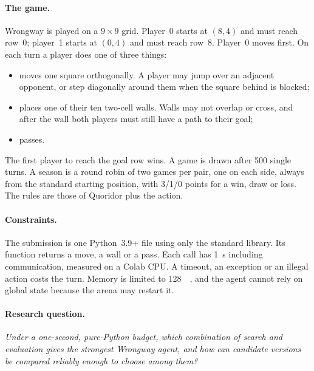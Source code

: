\paragraph{The game.}
Wrongway is played on a $9\times9$ grid. Player~0 starts at $(8,4)$ and must reach row~0;
player~1 starts at $(0,4)$ and must reach row~8. Player~0 moves first.
On each turn a player does one of three things:
\begin{itemize}
  \item moves one square orthogonally. A player may jump over an adjacent opponent, or step
        diagonally around them when the square behind is blocked;
  \item places one of their ten two-cell walls. Walls may not overlap or cross, and after the
        wall both players must still have a path to their goal;
  \item passes.
\end{itemize}
The first player to reach the goal row wins. A game is drawn after 500 single turns.
A season is a round robin of two games per pair, one on each side, always from the standard
starting position, with 3/1/0 points for a win, draw or loss.
The rules are those of Quoridor plus the  action.

\paragraph{Constraints.}
The submission is one Python~3.9+ file using only the standard library. Its function
 returns a move, a wall or a pass. Each call has \SI{1}{\second}
including communication, measured on a Colab CPU. A timeout, an exception or an illegal action
costs the turn. Memory is limited to \SI{128}{\mega\byte}, and the agent cannot rely on global
state because the arena may restart it.

\paragraph{Research question.}
\emph{Under a one-second, pure-Python budget, which combination of search and evaluation gives
the strongest Wrongway agent, and how can candidate versions be compared reliably enough to
choose among them?}

